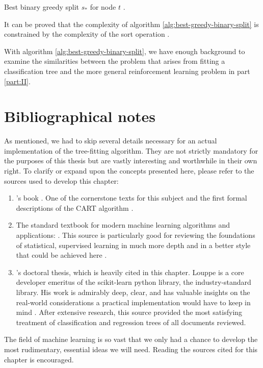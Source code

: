 \begin{algorithm}
    \caption[Best binary, greedy, split for node $t$.]{Best binary greedy split $s_*$ for node $t$ \cite[Ch.~3.6.3]{louppe2014}.}
    \label{alg:best-greedy-binary-split}
\end{algorithm}

It can be proved that the complexity of algorithm
\ref{alg:best-greedy-binary-split} is constrained by the complexity of the sort
operation \cite[Ch.~5]{louppe2014}.

With algorithm \ref{alg:best-greedy-binary-split}, we have enough background to
examine the similarities between the problem that arises from fitting a
classification tree and the more general reinforcement learning problem in part
\ref{part:II}.

\section{Bibliographical notes}
As mentioned, we had to skip several details necessary for an actual
implementation of the tree-fitting algorithm. They are not strictly mandatory
for the purposes of this thesis but are vastly interesting and worthwhile in
their own right. To clarify or expand upon the concepts presented here, please
refer to the sources used to develop this chapter:
\begin{enumerate}
    \item \citeauthor{breiman2017}'s book . One of the
        cornerstone texts for this subject and the first formal descriptions of
        the CART algorithm \cite{breiman2017}.
    \item The standard textbook for modern machine learning algorithms and
        applications: . This source is particularly good
        for reviewing the foundations of statistical, supervised learning in
        much more depth and in a better style that could be achieved here
        \cite{elements2009}.
    \item \citeauthor{louppe2014}'s doctoral thesis, which is heavily cited in
        this chapter. Louppe is a core developer emeritus of the scikit-learn
        python library, the industry-standard library. His work is admirably
        deep, clear, and has valuable insights on the real-world considerations
        a practical implementation would have to keep in mind \cite{louppe2014}.
        After extensive research, this source provided the most satisfying
        treatment of classification and regression trees of all documents
        reviewed.
\end{enumerate}

The field of machine learning is so vast that we only had a chance to develop
the most rudimentary, essential ideas we will need. Reading the sources cited
for this chapter is encouraged.